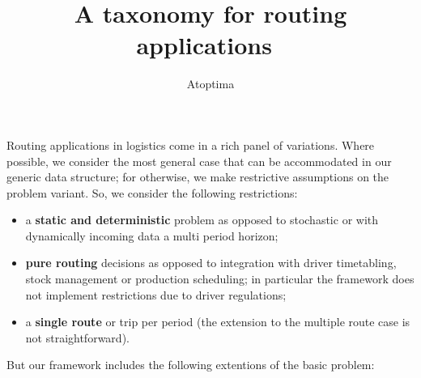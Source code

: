 \documentclass[12pt,a4paper]{article}
\title{A taxonomy for routing applications}
\author{Atoptima}
\begin{document}
\maketitle

Routing applications in logistics come in a rich panel of variations. Where possible, we consider the most general case that can be accommodated in our generic data structure; for otherwise, we make restrictive assumptions on the problem variant. So, we consider the following restrictions:
\begin{itemize}
\item a {\bf static and deterministic} problem as opposed to stochastic or with dynamically incoming data a multi period horizon;
\item {\bf pure routing} decisions as opposed to integration with driver timetabling, stock management or production scheduling; in particular the framework does not implement restrictions due to driver regulations;
\item a {\bf single route} or trip per period (the extension to the multiple route case is not straightforward).
\end{itemize}
But our framework includes the following extentions of the basic problem:
\end{document}
